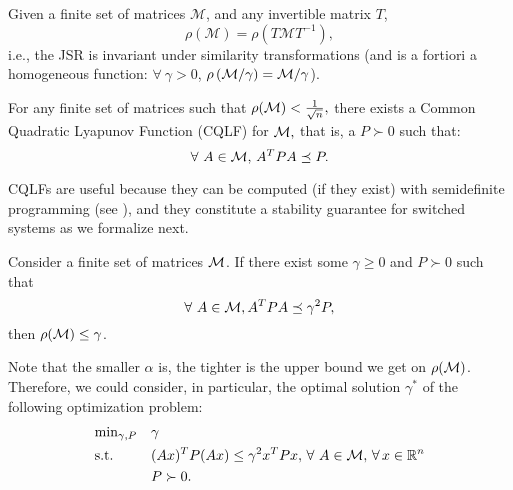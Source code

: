 \begin{property}\label{rem:scaling}
Given a finite set of matrices $\mathcal{M}$, and any invertible matrix $T$, 
$$\rho(\mathcal{M})=\rho(T \mathcal{M} T^{-1}),$$
i.e., the JSR is invariant under similarity transformations (and is a fortiori a homogeneous function: $\forall\  \gamma > 0$, $\rho \left(\mathcal{M}/\gamma \right) = \mathcal{M}/\gamma$).
\end{property}



\begin{theorem}\cite[Theorem 2.11]{jungers_lncis}\label{thm:john}
For any finite set of matrices such that $\rho(\mathcal{M})<\frac{1}{\sqrt{n}},$ there exists a Common Quadratic Lyapunov Function (CQLF) for $\mathcal{M},$ that is, a $P\succ 0$ such that: $$\forall\ A\in \mathcal{M},\, A^TPA\preceq P. $$
\end{theorem}

CQLFs are useful because they can be computed (if they exist) with semidefinite programming (see \cite{boyd}), and they constitute a stability guarantee for switched systems as we formalize next.

\begin{theorem}\cite[Prop. 2.8]{jungers_lncis}\label{thm:cqlf} Consider a finite set of matrices $\mathcal{M}$. If there exist some $\gamma \geq 0$ and $P \succ 0$ such that $$\forall\ A \in \mathcal{M}, A^TPA \preceq \gamma^2P,$$ then $\rho(\mathcal{M}) \leq \gamma$.
\end{theorem}

Note that the smaller $\alpha$ is, the tighter is the upper bound we get on $\rho(\mathcal{M})$. Therefore, we could consider, in particular, the optimal solution $\gamma^*$ of the following optimization problem:
\begin{equation}\label{eqn:campiOpt0}
\begin{aligned}
& \text{min}_{\gamma, P} & & \gamma\\
& \text{s.t.} 
&  & (Ax)^TP(Ax) \leq \gamma^2 x^TPx,\,\forall\ A \in \mathcal{M}, \,\forall\, x \in \mathbb{R}^n\\
& && P \succ 0. \\
\end{aligned}
\end{equation}

